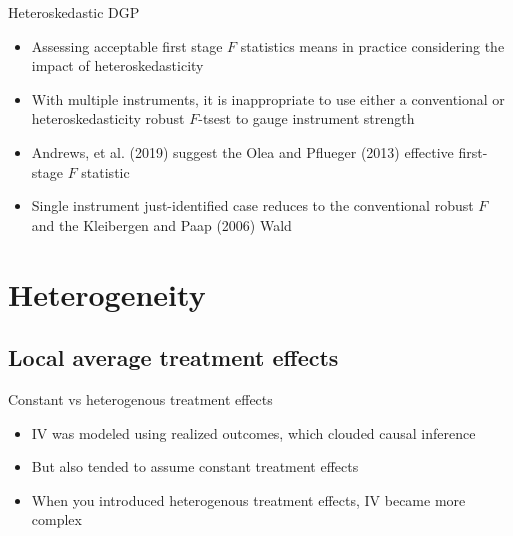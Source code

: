 \documentclass{beamer}
\begin{document}
\begin{frame}{Heteroskedastic DGP}

  \begin{itemize}
    \item Assessing acceptable first stage $F$ statistics means in practice considering the impact of heteroskedasticity
    \item With multiple instruments, it is inappropriate to use either a conventional or heteroskedasticity robust $F$-tsest to gauge instrument strength
    \item Andrews, et al. (2019) suggest the Olea and Pflueger (2013) effective first-stage $F$ statistic
    \item Single instrument just-identified case reduces to the conventional robust $F$ and the Kleibergen and Paap (2006) Wald
  \end{itemize}

\end{frame}




\section{Heterogeneity}



\subsection{Local average treatment effects}

\begin{frame}{Constant vs heterogenous treatment effects}

  \begin{itemize}
    \item IV was modeled using realized outcomes, which clouded causal inference
    \item But also tended to assume constant treatment effects
    \item When you introduced heterogenous treatment effects, IV became more complex
  \end{itemize}

\end{frame}
\end{document}
